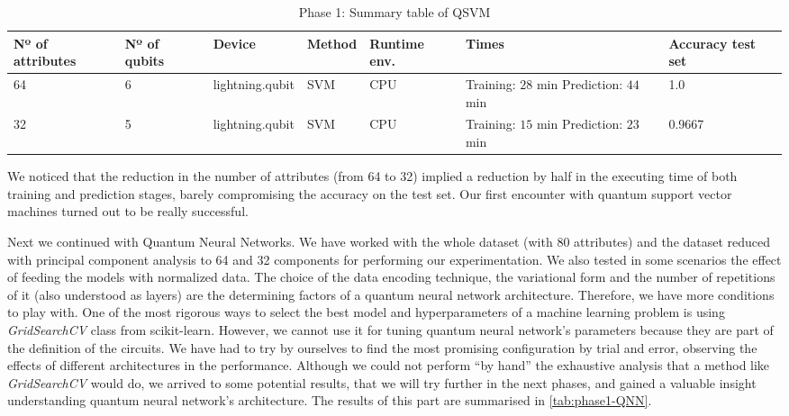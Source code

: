 \begin{table}[]
    \centering
    \begin{adjustbox}{width=\textwidth}
    \setlength{\tabcolsep}{10pt} %
    \renewcommand{\arraystretch}{1.5} %
    \begin{tabular}{p{}p{}p{}p{}p{}p{}p{}}
        \toprule
        Nº of attributes & Nº of qubits & Device & Method & Runtime env. & Times & Accuracy test set\\
         \hline
        64 & 6 & lightning.qubit & SVM & CPU & Training: $28$ min Prediction: $44$ min & 1.0 \\
        32 & 5 & lightning.qubit & SVM & CPU & Training: $15$ min Prediction: $23$ min & 0.9667
    \end{tabular}
    \end{adjustbox}
    \caption{Phase 1: Summary table of QSVM}
    \label{tab:phase1-QSVM}
\end{table}

We noticed that the reduction in the number of attributes (from 64 to 32) implied a reduction by half in the executing time of both training and prediction stages, barely compromising the accuracy on the test set. Our first encounter with quantum support vector machines turned out to be really successful.

Next we continued with Quantum Neural Networks. We have worked with the whole dataset (with 80 attributes) and the dataset reduced with principal component analysis to 64 and 32 components for performing our experimentation. We also tested in some scenarios the effect of feeding the models with normalized data. The choice of the data encoding technique, the variational form and the number of repetitions of it (also understood as layers) are the determining factors of a quantum neural network architecture. Therefore, we have more conditions to play with. One of the most rigorous ways to select the best model and hyperparameters of a machine learning problem is using \textit{GridSearchCV} class from scikit-learn. However, we cannot use it for tuning quantum neural network's parameters because they are part of the definition of the circuits. We have had to try by ourselves to find the most promising configuration by trial and error, observing the effects of different architectures in the performance. Although we could not perform ``by hand'' the exhaustive analysis that a method like \textit{GridSearchCV} would do, we arrived to some potential results, that we will try further in the next phases, and gained a valuable insight understanding quantum neural network's architecture. The results of this part are summarised in \autoref{tab:phase1-QNN}.


